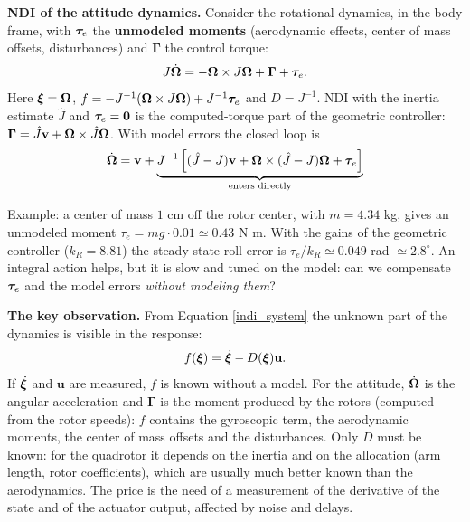 \documentclass[10pt, a4paper]{report}
\begin{document}
\noindent\textbf{NDI of the attitude dynamics.} Consider the rotational dynamics, in the body frame, with ${\boldsymbol{\tau}}_e$ the \textbf{unmodeled moments} (aerodynamic effects, center of mass offsets, disturbances) and $\boldsymbol{\Gamma}$ the control torque:\begin{equation}\label{indi_rot}
    J\dot{{\boldsymbol{\Omega}}}=-{\boldsymbol{\Omega}}\times J{\boldsymbol{\Omega}}+\boldsymbol{\Gamma}+{\boldsymbol{\tau}}_e.
\end{equation}
Here ${\boldsymbol{\xi}}={\boldsymbol{\Omega}}$, $f=-J^{-1}({\boldsymbol{\Omega}}\times J{\boldsymbol{\Omega}})+J^{-1}{\boldsymbol{\tau}}_e$ and $D=J^{-1}$. NDI with the inertia estimate $\hat J$ and ${\boldsymbol{\tau}}_e=\mathbf 0$ is the computed-torque part of the geometric controller: $\boldsymbol{\Gamma}=\hat J\mathbf v+{\boldsymbol{\Omega}}\times\hat J{\boldsymbol{\Omega}}$. With model errors the closed loop is
\begin{equation}
    \dot{{\boldsymbol{\Omega}}}=\mathbf v+\underbrace{J^{-1}\left[(\hat J-J)\mathbf v+{\boldsymbol{\Omega}}\times(\hat J-J){\boldsymbol{\Omega}}+{\boldsymbol{\tau}}_e\right]}_{\text{enters directly}}
\end{equation}
\begin{boxobservation}{}{}
Example: a center of mass $1$ cm off the rotor center, with $m=4.34$ kg, gives an unmodeled moment $\tau_e=mg\cdot0.01\simeq0.43$ N m. With the gains of the geometric controller ($k_R=8.81$) the steady-state roll error is $\tau_e/k_R\simeq0.049$ rad $\simeq2.8^\circ$. An integral action helps, but it is slow and tuned on the model: can we compensate ${\boldsymbol{\tau}}_e$ and the model errors \textit{without modeling them}?
\end{boxobservation}
\noindent\textbf{The key observation.} From Equation \eqref{indi_system} the unknown part of the dynamics is visible in the response:\begin{equation}
    f({\boldsymbol{\xi}})=\dot{{\boldsymbol{\xi}}}-D({\boldsymbol{\xi}})\mathbf u.
\end{equation}
If $\dot{{\boldsymbol{\xi}}}$ and $\mathbf u$ are measured, $f$ is known without a model. For the attitude, $\dot{{\boldsymbol{\Omega}}}$ is the angular acceleration and $\boldsymbol{\Gamma}$ is the moment produced by the rotors (computed from the rotor speeds): $f$ contains the gyroscopic term, the aerodynamic moments, the center of mass offsets and the disturbances. Only $D$ must be known: for the quadrotor it depends on the inertia and on the allocation (arm length, rotor coefficients), which are usually much better known than the aerodynamics. The price is the need of a measurement of the derivative of the state and of the actuator output, affected by noise and delays.\bigskip
\end{document}
